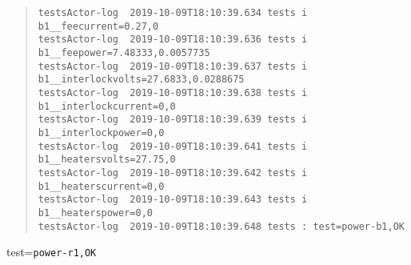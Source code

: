 \begin{quote}
\begin{tiny}
\begin{verbatim}
testsActor-log  2019-10-09T18:10:39.634 tests i b1__feecurrent=0.27,0
testsActor-log  2019-10-09T18:10:39.636 tests i b1__feepower=7.48333,0.0057735
testsActor-log  2019-10-09T18:10:39.637 tests i b1__interlockvolts=27.6833,0.0288675
testsActor-log  2019-10-09T18:10:39.638 tests i b1__interlockcurrent=0,0
testsActor-log  2019-10-09T18:10:39.639 tests i b1__interlockpower=0,0
testsActor-log  2019-10-09T18:10:39.641 tests i b1__heatersvolts=27.75,0
testsActor-log  2019-10-09T18:10:39.642 tests i b1__heaterscurrent=0,0
testsActor-log  2019-10-09T18:10:39.643 tests i b1__heaterspower=0,0
testsActor-log  2019-10-09T18:10:39.648 tests : test=power-b1,OK
\end{verbatim}
\end{tiny}
\end{quote}

\noindent test=\texttt{power-r1,OK}

